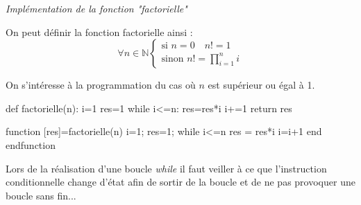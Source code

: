 \documentclass[10pt,fleqn]{article} %
\begin{document}
\begin{exemple}
\textit{Implémentation de la fonction "factorielle"}

On peut définir la fonction factorielle ainsi : 
$$
\forall  n\in \mathbb{N}
\left\{
\begin{array}{l}
\text{si } n=0 \quad n!=1\\
\text{sinon } n !=\prod\limits_{i=1}^n i
\end{array}
\right.
$$
 
On s'intéresse à la programmation du cas où $n$ est supérieur ou égal à 1.

\begin{minipage}[c]{.3\linewidth}
\begin{pseudo}
\begin{algorithm}[H]
\end{algorithm}
\end{pseudo}
\end{minipage}\hfill
\begin{minipage}[c]{.3\linewidth}
\begin{py}
\begin{python}
def factorielle(n):
        i=1    
        res=1
        while i<=n:
            res=res*i
            i+=1
        return res
\end{python}
\end{py}
\end{minipage}\hfill
\begin{minipage}[c]{.3\linewidth}
\begin{sci}
\begin{scilab}
function [res]=factorielle(n)
  i=1;
  res=1;
  while i<=n
    res = res*i
    i=i+1
  end
endfunction
\end{scilab}
\end{sci}
\end{minipage}

\end{exemple}



\begin{warn}
Lors de la réalisation d'une boucle \textsl{while} il faut veiller à ce que l'instruction conditionnelle change d'état afin de sortir de la boucle et de ne pas provoquer une boucle sans fin...
\end{warn}
\end{document}
